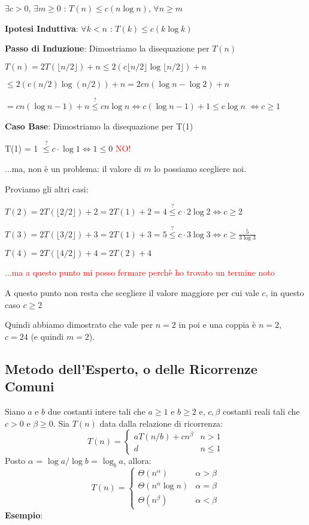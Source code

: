\documentclass[../cheatSheetAlgoritmi.tex]{subfiles}
\begin{document}
$\exists c > 0$, $\exists m \geq 0$ : $T(n) \leq c(n\log{n})$, $\forall n \geq m$

\bigskip

\textbf{Ipotesi Induttiva}: $\forall k < n$ : $T(k) \leq c(k\log{k})$

\textbf{Passo di Induzione}: Dimostriamo la disequazione per $T(n)$

$T(n) = 2T(\lfloor n/2 \rfloor) + n \leq 2(c \lfloor n/2 \rfloor \log{\lfloor n/2 \rfloor}) + n$

$\leq 2(c(n/2) \log{(n/2)}) + n = 2cn(\log{n} - \log{2}) + n$

$= cn(\log{n} - 1) + n \stackrel{?}{\leq} cn\log{n} \iff c(\log{n}-1) + 1 \leq c \log{n}$ 
$\iff c \geq 1$

\textbf{Caso Base}: Dimostriamo la disequazione per T(1)

T(1) = 1 $\stackrel{?}{\leq} c \cdot \log{1} \iff 1 \leq 0$ \textcolor{red}{NO!}

...ma, non è un problema: il valore di $m$ lo possiamo scegliere noi.

Proviamo gli altri casi:

$T(2) = 2T(\lfloor 2/2 \rfloor) + 2 = 2T(1) + 2 = 4 \stackrel{?}{\leq} c \cdot 2 \log{2} \iff c \geq 2$

$T(3) = 2T(\lfloor 3/2 \rfloor) + 3 = 2T(1) + 3 = 5 \stackrel{?}{\leq} c \cdot 3 \log{3} \iff c \geq \frac{5}{3 \log{3}}$

$T(4) = 2T(\lfloor 4/2 \rfloor) + 4 = 2T(2) + 4$

\textcolor{red}{...ma a questo punto mi posso fermare perchè ho trovato un termine noto}

A questo punto non resta che scegliere il valore maggiore per cui vale $c$, in questo caso $c \geq 2$

Quindi abbiamo dimostrato che vale per $n = 2$ in poi e una coppia è $n = 2$, $c = 24$ (e quindi $m = 2$).

\subsection{Metodo dell'Esperto, o delle Ricorrenze Comuni}
Siano $a$ e $b$ due costanti intere tali che $a \geq 1$ e $b \geq 2$ e, $c, \beta$ costanti reali tali che $c > 0$ e $\beta \geq 0$. Sia $T(n)$ data dalla relazione di ricorrenza:
	\begin{equation*}
  		T(n)=\begin{cases}
    		aT(n/b) + cn^{\beta} & \text{$n > 1$}\\
    		d & \text{$n \leq 1$}
  		\end{cases}	
	\end{equation*}
Posto $\alpha$ = $\log{a}/\log{b}$ = $\log_{b}{a}$, allora:
	\begin{equation*}
  		T(n)=\begin{cases}
			\Theta(n^{\alpha}) & \text{$\alpha > \beta$}\\
    		\Theta(n^{\alpha} \log{n}) & \text{$\alpha = \beta$}\\
    		\Theta(n^{\beta}) & \text{$\alpha < \beta$}
  		\end{cases}
	\end{equation*}
\textbf{Esempio}:
\end{document}
